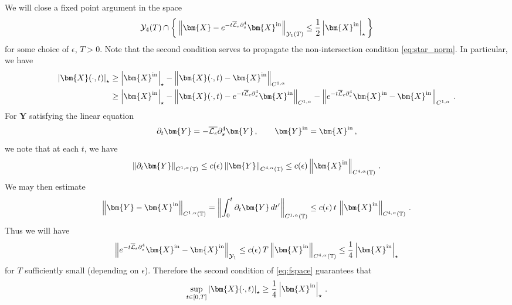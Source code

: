 \documentclass[11pt,reqno]{amsart}
\newcommand{\T}{\mathbb{T}}
\newcommand{\X}{\bm{X}}
\newcommand{\Y}{\bm{Y}}
\newcommand{\p}{\partial}
\newcommand{\abs}[1]{\left\lvert #1 \right\rvert}
\newcommand{\norm}[1]{\left\lVert #1 \right\rVert}
\newcommand{\mc}[1]{\mathcal{#1}}
\theoremstyle{definition}
\begin{document}
We will close a fixed point argument in the space
\begin{equation}\label{eq:fspace}
   \mc{Y}_4(T) \cap \bigg\{ \norm{\X-e^{-t\overline{\mc{L}}_\epsilon\p_s^4}\X^{\rm in}}_{\mc{Y}_1(T)}\le \frac{1}{2}\abs{\X^{\rm in}}_\star \bigg\} 
\end{equation}
for some choice of $\epsilon$, $T>0$. Note that the second condition serves to propagate the non-intersection condition \eqref{eq:star_norm}. 
In particular, we have
\begin{equation}
\begin{aligned}
  \abs{\X(\cdot,t)}_\star &\ge \abs{\X^{\rm in}}_\star - \norm{\X(\cdot,t)-\X^{\rm in}}_{C^{1,\alpha}} \\
  &\ge \abs{\X^{\rm in}}_\star - \norm{\X(\cdot,t)-e^{-t\overline{\mc{L}}_\epsilon\p_s^4}\X^{\rm in}}_{C^{1,\alpha}} - \norm{e^{-t\overline{\mc{L}}_\epsilon\p_s^4}\X^{\rm in}-\X^{\rm in}}_{C^{1,\alpha}} \,.
\end{aligned}
\end{equation}
%
%
For $\Y$ satisfying the linear equation
\begin{equation}
  \p_t\Y = -\overline{\mc{L}_\epsilon}\p_s^4\Y\,, \qquad \Y^{\rm in}= \X^{\rm in}\,,
\end{equation}
we note that at each $t$, we have 
\begin{equation}
  \norm{\p_t\Y}_{C^{1,\alpha}(\T)} \le c(\epsilon)\norm{\Y}_{C^{4,\alpha}(\T)} \le c(\epsilon)\norm{\X^{\rm in}}_{C^{4,\alpha}(\T)}\,. 
\end{equation}
We may then estimate
\begin{equation}
  \norm{\Y - \X^{\rm in}}_{C^{1,\alpha}(\T)} = \norm{\int_0^t\p_t\Y\,dt'}_{C^{1,\alpha}(\T)} \le c(\epsilon)\,t\,\norm{\X^{\rm in}}_{C^{4,\alpha}(\T)}\,.
\end{equation}
Thus we will have
\begin{equation}\label{eq:T1_def}
  \norm{e^{-t\overline{\mc{L}}_\epsilon\p_s^4}\X^{\rm in}-\X^{\rm in}}_{\mc{Y}_1} \le c(\epsilon)\,T\norm{\X^{\rm in}}_{C^{4,\alpha}(\T)} 
  \le \frac{1}{4}\abs{\X^{\rm in}}_\star
\end{equation}
for $T$ sufficiently small (depending on $\epsilon$). Therefore the second condition of \eqref{eq:fspace} guarantees that
\begin{equation}
  \sup_{t\in[0,T]} \abs{\X(\cdot,t)}_\star \ge \frac{1}{4}\abs{\X^{\rm in}}_\star\,.
\end{equation}
\end{document}
